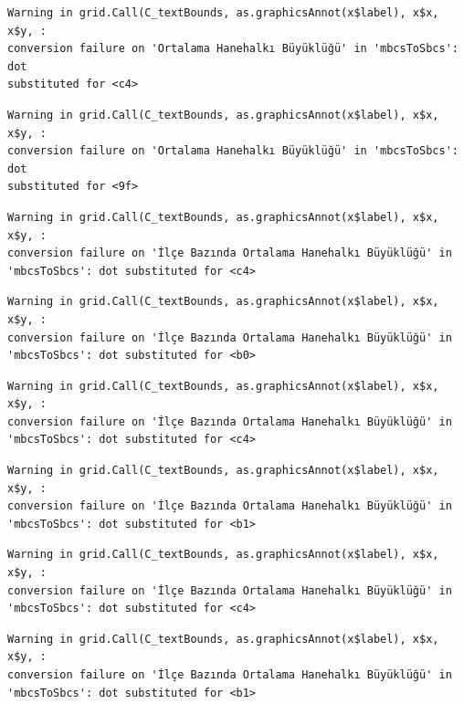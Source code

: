 \documentclass[
  11pt,
  a4paper,
  DIV=11,
  numbers=noendperiod]{scrartcl}
\begin{document}
\begin{verbatim}
Warning in grid.Call(C_textBounds, as.graphicsAnnot(x$label), x$x, x$y, :
conversion failure on 'Ortalama Hanehalkı Büyüklüğü' in 'mbcsToSbcs': dot
substituted for <c4>
\end{verbatim}

\begin{verbatim}
Warning in grid.Call(C_textBounds, as.graphicsAnnot(x$label), x$x, x$y, :
conversion failure on 'Ortalama Hanehalkı Büyüklüğü' in 'mbcsToSbcs': dot
substituted for <9f>
\end{verbatim}

\begin{verbatim}
Warning in grid.Call(C_textBounds, as.graphicsAnnot(x$label), x$x, x$y, :
conversion failure on 'İlçe Bazında Ortalama Hanehalkı Büyüklüğü' in
'mbcsToSbcs': dot substituted for <c4>
\end{verbatim}

\begin{verbatim}
Warning in grid.Call(C_textBounds, as.graphicsAnnot(x$label), x$x, x$y, :
conversion failure on 'İlçe Bazında Ortalama Hanehalkı Büyüklüğü' in
'mbcsToSbcs': dot substituted for <b0>
\end{verbatim}

\begin{verbatim}
Warning in grid.Call(C_textBounds, as.graphicsAnnot(x$label), x$x, x$y, :
conversion failure on 'İlçe Bazında Ortalama Hanehalkı Büyüklüğü' in
'mbcsToSbcs': dot substituted for <c4>
\end{verbatim}

\begin{verbatim}
Warning in grid.Call(C_textBounds, as.graphicsAnnot(x$label), x$x, x$y, :
conversion failure on 'İlçe Bazında Ortalama Hanehalkı Büyüklüğü' in
'mbcsToSbcs': dot substituted for <b1>
\end{verbatim}

\begin{verbatim}
Warning in grid.Call(C_textBounds, as.graphicsAnnot(x$label), x$x, x$y, :
conversion failure on 'İlçe Bazında Ortalama Hanehalkı Büyüklüğü' in
'mbcsToSbcs': dot substituted for <c4>
\end{verbatim}

\begin{verbatim}
Warning in grid.Call(C_textBounds, as.graphicsAnnot(x$label), x$x, x$y, :
conversion failure on 'İlçe Bazında Ortalama Hanehalkı Büyüklüğü' in
'mbcsToSbcs': dot substituted for <b1>
\end{verbatim}
\end{document}

